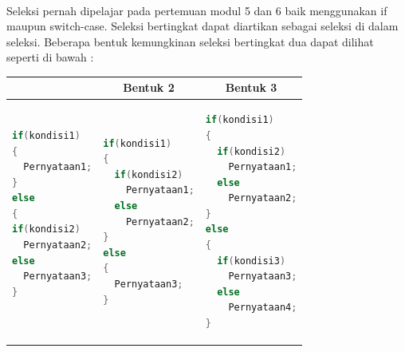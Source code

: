 \documentclass[a4paper,12pt]{article}
\begin{document}
\paragraph{}
Seleksi pernah dipelajar pada pertemuan modul 5 dan 6 baik menggunakan if maupun
switch-case. Seleksi bertingkat dapat diartikan sebagai seleksi di dalam seleksi. Beberapa bentuk kemungkinan seleksi bertingkat dua dapat dilihat seperti di bawah :
\begin{table}[!ht]
	\begin{tabular}{|l|l|l|}
		\hline
		\rowcolor[HTML]{E5B9B7}
		\multicolumn{1}{|c|}{\cellcolor[HTML]{E5B9B7} Bentuk 1} & \multicolumn{1}{c|}{\cellcolor[HTML]{E5B9B7} Bentuk 2} & \multicolumn{1}{c|}{\cellcolor[HTML]{E5B9B7} Bentuk 3} \\ \hline
		
		{\begin{lstlisting}[language=Java]
if(kondisi1)
{
  Pernyataan1;
}
else
{
if(kondisi2)
  Pernyataan2;
else
  Pernyataan3;
}
			
		\end{lstlisting}}&
{\begin{lstlisting}[language=Java]
if(kondisi1)
{
  if(kondisi2)
    Pernyataan1;
  else
    Pernyataan2;
}
else
{
  Pernyataan3;
}
	\end{lstlisting}}
	
	                               &
{\begin{lstlisting}[language=Java]
if(kondisi1)
{
  if(kondisi2)
    Pernyataan1;
  else
    Pernyataan2;
}
else
{
  if(kondisi3)
    Pernyataan3;
  else
    Pernyataan4;
}
\end{lstlisting}}
	                                                              \\ \hline
	\end{tabular}
\end{table}
\end{document}
